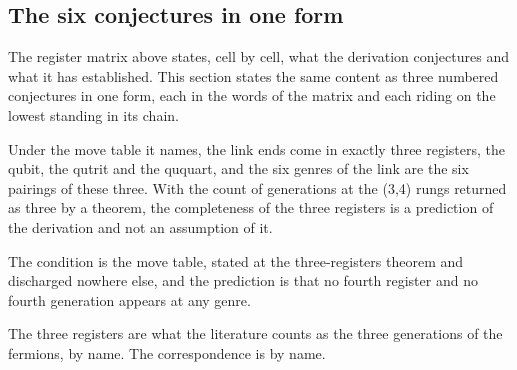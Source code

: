 \subsection*{The six conjectures in one form}
The register matrix above states, cell by cell, what the derivation conjectures and what it has established. This section states the same content as three numbered conjectures in one form, each in the words of the matrix and each riding on the lowest standing in its chain.
\begin{chconditional}
Under the move table it names, the link ends come in exactly three registers, the qubit, the qutrit and the ququart, and the six genres of the link are the six pairings of these three. With the count of generations at the (3,4) rungs returned as three by a theorem, the completeness of the three registers is a prediction of the derivation and not an assumption of it.
\end{chconditional}
\chdeps{}{}
The condition is the move table, stated at the three-registers theorem and discharged nowhere else, and the prediction is that no fourth register and no fourth generation appears at any genre.
\begin{chbridge}
The three registers are what the literature counts as the three generations of the fermions, by name. The correspondence is by name.
\end{chbridge}
